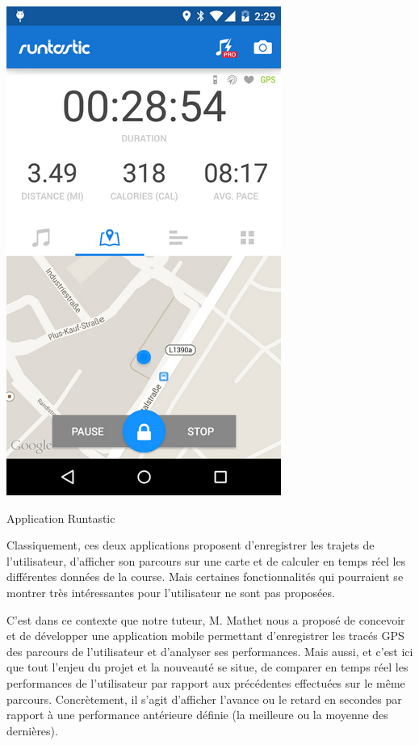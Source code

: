 \begin{multicols}{2}
\begin{img}
  \includegraphics[scale=0.8]{img/Runtastic.png}
  \caption{Application Runtastic}
\end{img}
\end{multicols}

Classiquement, ces deux applications proposent d'enregistrer les trajets de l'utilisateur, d'afficher son parcours sur une carte et de calculer en temps réel les différentes données de la course. Mais certaines fonctionnalités qui pourraient se montrer très intéressantes pour l'utilisateur ne sont pas proposées.\bigskip

C'est dans ce contexte que notre tuteur, M. Mathet nous a proposé de concevoir et de développer une application mobile permettant d'enregistrer les tracés GPS des parcours de l'utilisateur et d'analyser ses performances. Mais aussi, et c'est ici que tout l'enjeu du projet et la nouveauté se situe, de comparer en temps réel les performances de l'utilisateur par rapport aux  précédentes effectuées sur le même parcours. Concrètement, il s'agit d'afficher l'avance ou le retard en secondes par rapport à une performance antérieure définie (la meilleure ou la moyenne des dernières). 
